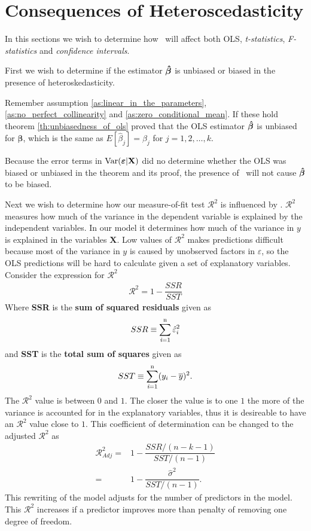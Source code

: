\newpage
\section{Consequences of Heteroscedasticity}\label{sec:consequence_of_hetero}
In this sections we wish to determine how \hetero \ will affect both OLS, \textit{t-statistics}, \textit{F-statistics} and \textit{confidence intervals}. 

First we wish to determine if the estimator $\operatorname{\boldsymbol{\hat{\beta}}}$ is unbiased or biased in the presence of heteroskedasticity.  

Remember assumption \ref{as:linear_in_the_parameters}, \ref{as:no_perfect_collinearity} and \ref{as:zero_conditional_mean}. If these hold theorem \ref{th:unbiasedness_of_ols} proved that the OLS estimator $\operatorname{\boldsymbol{\hat{\beta}}}$ is unbiased for $\boldsymbol{\beta}$, which is the same as $E[\hat{\beta}_j] = \beta_j
$ for $j = 1,2, \ldots, k$. 

Because the error terms in $\operatorname{\text{Var}}(\boldsymbol{\varepsilon} | \mathbf{X})$ did no determine whether the OLS was biased or unbiased in the theorem and its proof, the presence of \hetero \ will not cause $\operatorname{\boldsymbol{\hat{\beta}}}$ to be biased. 

Next we wish to determine how our measure-of-fit test $\mathcal{R}^2$ is influenced by \hetero. 
$\mathcal{R}^2$ measures how much of the variance in the dependent variable is explained by the independent variables. In our model it determines how much of the variance in $y$ is explained in the variables $\mathbf{X}$. 
Low values of $\mathcal{R}^2$ makes predictions difficult because most of the variance in $y$ is caused by unobserved factors in $\varepsilon$, so the OLS predictions will be hard to calculate given a set of explanatory variables.
Consider the expression for $\mathcal{R}^2$
\begin{align*}
    \mathcal{R}^2 = 1 - \dfrac{SSR}{SST}
\end{align*}
Where \textbf{SSR} is the \textbf{sum of squared residuals} given as
\begin{align*}
    SSR \equiv \operatorname{\sum_{\textit{i}=1}^n} \hat{\varepsilon}_i^2
\end{align*}
and \textbf{SST} is the \textbf{total sum of squares} given as
\begin{align*}
    SST \equiv \operatorname{\sum_{\textit{i}=1}^n} (y_i - \overline{y})^2. 
\end{align*}
The $\mathcal{R}^2$ value is between $0$ and $1$. The closer the value is to one $1$ the more of the variance is accounted for in the explanatory variables, thus it is desireable to have an $\mathcal{R}^2$ value close to $1$.
This coefficient of determination can be changed to the adjusted $\mathcal{R}^2$ as
\begin{align*}
    \mathcal{R}^2_{Adj} =& 1 - \dfrac{SSR/(n - k - 1)}{SST/(n - 1)}\\
      =& 1 - \dfrac{\hat{\sigma}^2}{SST/(n-1)}.
\end{align*}
This rewriting of the model adjusts for the number of predictors in the model. This $\mathcal{R}^2$ increases if a predictor improves more than penalty of removing one degree of freedom. 

